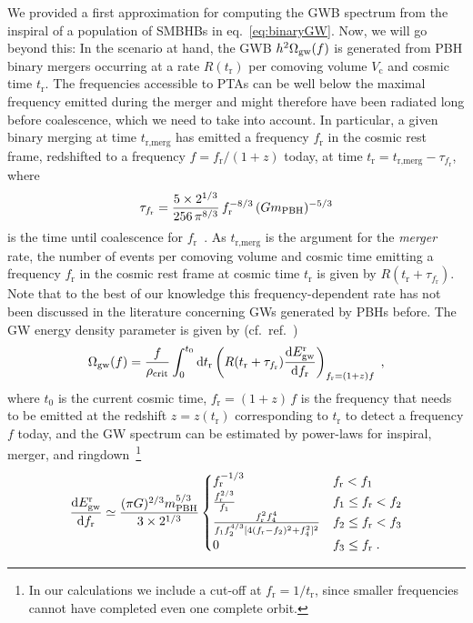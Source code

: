 We provided a first approximation for computing the \ac{GWB} spectrum from the inspiral of a population of \acp{SMBHB} in eq.~\eqref{eq:binaryGW}. Now, we will go beyond this: In the scenario at hand, the \ac{GWB} $h^2 \Omega_{\text{gw}} (f)$ is generated from \ac{PBH} binary mergers occurring at a rate $R (t_\text{r})$ per comoving volume $V_\text{c}$ and cosmic  time $t_\text{r}$. The frequencies accessible to \acp{PTA} can be well below the maximal frequency emitted during the merger and might therefore have been radiated long before coalescence, which we need to take into account. In particular, a given binary merging at time $t_{\text{r,merg}}$ has emitted a frequency $f_\text{r}$ in the cosmic rest frame, redshifted to a frequency $f = f_\text{r} / (1+z)$ today, at time $t_\text{r} = t_{\text{r,merg}} - \tau_{f_\text{r}}$, where
\begin{align}
	\tau_{f_\text{r}} = \frac{5 \times  2^{1/3}}{256 \, \pi^{8/3}} \, f_\text{r}^{-8/3} \, (G  m_{\mathrm{PBH}})^{-5/3} \label{eq:tau_f_r}
\end{align}
is the time until coalescence for $f_\text{r}$~\cite{Maggiore:2007ulw}. As $t_{\text{r,merg}}$ is the argument for the \textit{merger} rate, the number of events per comoving volume and cosmic time emitting a frequency $f_\text{r}$ in the cosmic rest frame at cosmic time $t_\text{r}$ is given by $R (t_\text{r} + \tau_{f_\text{r}})$. Note that to the best of our knowledge this frequency-dependent rate has not been discussed in the literature concerning \acp{GW} generated by \acp{PBH} before. The \ac{GW} energy density parameter is given by (cf.~ref.~\cite{Phinney:2001di})
\begin{align}
	\Omega_{\text{gw}} (f) = \frac{f}{\rho_\mathrm{crit}} \int_0^{t_0} \mathrm{d} t_\text{r} \left( R (t_\text{r} + \tau_{f_\text{r}}) \frac{\mathrm{d} E_{\text{gw}}^\text{r}}{\mathrm{d} f_\text{r}} \right)_{f_\text{r} = (1+z) f} \;, \label{eq:omega_gw}
\end{align}
where $t_0$ is the current cosmic time, $f_\text{r} = (1+z) \,f$ is the frequency that needs to be emitted  at the redshift $z = z(t_\text{r})$ corresponding to $t_\text{r}$ to detect a frequency $f$ today, and the \ac{GW} spectrum can be estimated by power-laws for inspiral, merger, and ringdown~\cite{Ajith:2007kx}\footnote{In our calculations we include a cut-off at $f_\text{r}= 1/t_\text{r}$, since smaller frequencies cannot have completed even one complete orbit.}
\begin{align}
	\frac{\mathrm{d} E_{\text{gw}}^\text{r}}{\mathrm{d} f_\text{r}} \simeq \frac{(\pi  G)^{2/3}   m_{\mathrm{PBH}}^{5/3}}{3 \times 2^{1/3} } \begin{cases}
		f_\text{r}^{-1/3} &f_\text{r} < f_1 \\
		\frac{f_\text{r}^{2/3}}{f_1} &f_1 \leq f_\text{r} < f_2 \\
		\frac{f_\text{r}^2 f_4^4}{f_1 f_2^{4/3} [4 (f_\text{r} - f_2)^2 + f_4^2]^2} &f_2 \leq f_\text{r} < f_3 \\
		0  & f_3 \leq f_\text{r}\;.
	\end{cases} \label{eq:gw_spectrum}
\end{align}
